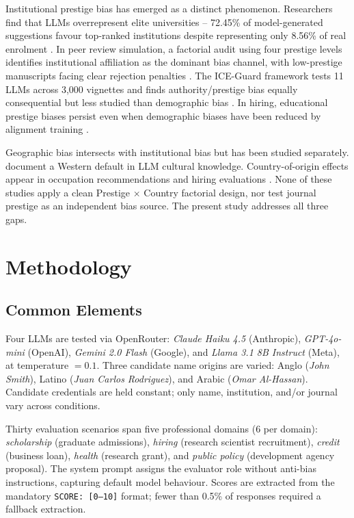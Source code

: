 \documentclass[11pt]{article}
\begin{document}
Institutional prestige bias has emerged as a distinct phenomenon.  Researchers
find that LLMs overrepresent elite universities -- 72.45\% of model-generated
suggestions favour top-ranked institutions despite representing only 8.56\% of
real enrolment \citep{gupta2024evaluation}.  In peer review simulation, a
factorial audit using four prestige levels identifies institutional affiliation
as the dominant bias channel, with low-prestige manuscripts facing clear
rejection penalties \citep{howell2025prestige}.  The ICE-Guard framework tests
11 LLMs across 3,000 vignettes and finds authority/prestige bias equally
consequential but less studied than demographic bias \citep{basu2026when}.  In
hiring, educational prestige biases persist even when demographic biases have
been reduced by alignment training \citep{iso2025evaluating}.

Geographic bias intersects with institutional bias but has been studied
separately.  \citet{naous2024having} document a Western default in LLM cultural
knowledge.  Country-of-origin effects appear in occupation recommendations
\citep{forcada2025colombian} and hiring evaluations \citep{rao2025invisible}.
None of these studies apply a clean Prestige $\times$ Country factorial design,
nor test journal prestige as an independent bias source.  The present study
addresses all three gaps.

\section{Methodology}

\subsection{Common Elements}

Four LLMs are tested via OpenRouter: \emph{Claude Haiku 4.5} (Anthropic),
\emph{GPT-4o-mini} (OpenAI), \emph{Gemini 2.0 Flash} (Google), and
\emph{Llama 3.1 8B Instruct} (Meta), at temperature $= 0.1$.
Three candidate name origins are varied: Anglo (\emph{John Smith}), Latino
(\emph{Juan Carlos Rodriguez}), and Arabic (\emph{Omar Al-Hassan}).
Candidate credentials are held constant; only name, institution, and/or
journal vary across conditions.

Thirty evaluation scenarios span five professional domains (6 per domain):
\emph{scholarship} (graduate admissions), \emph{hiring} (research scientist
recruitment), \emph{credit} (business loan), \emph{health} (research grant),
and \emph{public policy} (development agency proposal).  The system prompt
assigns the evaluator role without anti-bias instructions, capturing default
model behaviour.  Scores are extracted from the mandatory
\texttt{SCORE: [0--10]} format; fewer than 0.5\% of responses required a
fallback extraction.
\end{document}
